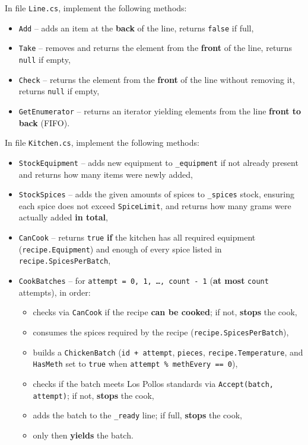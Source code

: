 \documentclass[11pt,a4paper,addpoints]{exam}
\renewcommand*\half{.5}
\begin{document}
\begin{questions}

\question[1\half] In file \texttt{Line.cs}, implement the following methods:
\begin{itemize}
    \item \texttt{Add} -- adds an item at the \textbf{back} of the line, returns \texttt{false} if full,
    \item \texttt{Take} -- removes and returns the element from the \textbf{front} of the line, returns \texttt{null} if empty,
    \item \texttt{Check} -- returns the element from the \textbf{front} of the line without removing it, returns \texttt{null} if empty,
    \item \texttt{GetEnumerator} -- returns an iterator yielding elements from the line \textbf{front to back} (FIFO).
\end{itemize}

\question[2\half] In file \texttt{Kitchen.cs}, implement the following methods:
\begin{itemize}
    \item \texttt{StockEquipment} -- adds new equipment to \texttt{\_equipment} if not already present and returns how many items were newly added,
    \item \texttt{StockSpices} -- adds the given amounts of spices to \texttt{\_spices} stock, ensuring each spice does not exceed \texttt{SpiceLimit}, and returns how many grams were actually added \textbf{in total},
    \item \texttt{CanCook} -- returns \texttt{true} \textbf{if} the kitchen has all required equipment (\texttt{recipe.Equipment}) and enough of every spice listed in \texttt{recipe.SpicesPerBatch},
    \item \texttt{CookBatches} -- for \texttt{attempt = 0, 1, \dots, count - 1} (\textbf{at most} \texttt{count} attempts), in order:
    \begin{itemize}
        \item checks via \texttt{CanCook} if the recipe \textbf{can be cooked}; if not, \textbf{stops} the cook,
        \item consumes the spices required by the recipe (\texttt{recipe.SpicesPerBatch}),
        \item builds a \texttt{ChickenBatch} (\texttt{id + attempt}, \texttt{pieces}, \texttt{recipe.Temperature}, and \texttt{HasMeth} set to \texttt{true} when \texttt{attempt \% methEvery == 0}),
        \item checks if the batch meets Los Pollos standards via \texttt{Accept(batch, attempt)}; if not, \textbf{stops} the cook,
        \item adds the batch to the \texttt{\_ready} line; if full, \textbf{stops} the cook,
        \item only then \textbf{yields} the batch.
    \end{itemize}
\end{itemize}


\end{questions}
\end{document}
